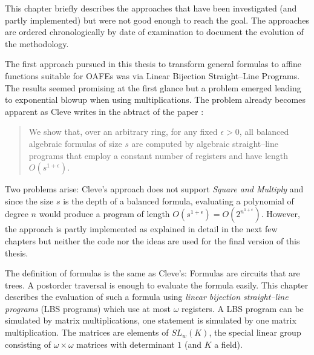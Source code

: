 \label{sec:discontinued}

This chapter briefly describes the approaches that have been investigated (and
partly implemented) but were not good enough to reach the goal. The approaches
are ordered chronologically by date of examination to document the evolution of
the methodology.


%
%
\label{sec:using-lbs}

The first approach pursued in this thesis to transform general formulas to
affine functions suitable for OAFEs was via Linear Bijection Straight--Line
Programs.  The results seemed promising at the first glance but a problem
emerged leading to exponential blowup when using multiplications. The problem
already becomes apparent as Cleve writes in the abtract of the paper
\cite{cleve91}:

\begin{quote}
  We show that, over an arbitrary ring, for any fixed $\epsilon > 0$, all
  balanced algebraic formulas of size $s$ are computed by algebraic
  straight--line programs that employ a constant number of registers and have
  length $O(s^{1 + \epsilon})$.\cite{cleve91}
\end{quote}

\noindent{}Two problems arise: Cleve's approach does not support \emph{Square
and Multiply}\cite{knuth81} and since the size $s$ is the depth of a balanced
formula, evaluating a polynomial of degree $n$ would produce a program of length
$O(s^{1 + \epsilon}) = O(2^{n^{1 + \epsilon}})$. However, the approach is partly
implemented as explained in detail in the next few chapters but neither the code
nor the ideas are used for the final version of this thesis.

\label{sec:FormulasToMatrixMuls}

The definition of formulas is the same as Cleve's\cite{cleve91}: Formulas are
circuits that are trees. A postorder traversal is enough to evaluate the formula
easily. This chapter describes the evaluation of such a formula using
\emph{linear bijection straight--line programs} (LBS programs)\cite{cleve91}
which use at most $\omega$ registers. A LBS program can be simulated by matrix
multiplications, one statement is simulated by one matrix multiplication. The
matrices are elements of $SL_w(K)$, the special linear group consisting of
$\omega \times \omega$ matrices with determinant $1$ (and $K$ a field).

